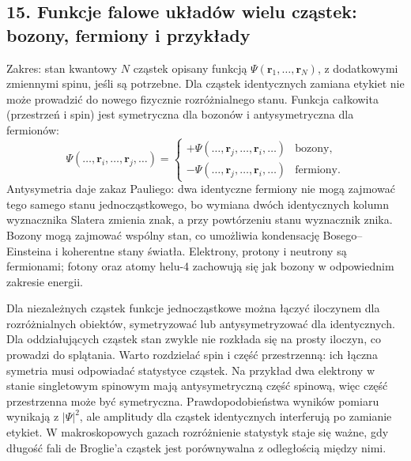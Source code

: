 \documentclass[11pt,a4paper]{article}
\begin{document}
\subsection{15. Funkcje falowe układów wielu cząstek: bozony, fermiony i przykłady}
Zakres: stan kwantowy \(N\) cząstek opisany funkcją \(\Psi(\mathbf r_1,\ldots,\mathbf r_N)\), z dodatkowymi zmiennymi spinu, jeśli są potrzebne. Dla cząstek identycznych zamiana etykiet nie może prowadzić do nowego fizycznie rozróżnialnego stanu. Funkcja całkowita (przestrzeń i spin) jest symetryczna dla bozonów i antysymetryczna dla fermionów:
\[
\Psi(\ldots,\mathbf r_i,\ldots,\mathbf r_j,\ldots)
=\begin{cases}
+\Psi(\ldots,\mathbf r_j,\ldots,\mathbf r_i,\ldots)&\text{bozony},\\
-\Psi(\ldots,\mathbf r_j,\ldots,\mathbf r_i,\ldots)&\text{fermiony}.
\end{cases}
\]
Antysymetria daje zakaz Pauliego: dwa identyczne fermiony nie mogą zajmować tego samego stanu jednocząstkowego, bo wymiana dwóch identycznych kolumn wyznacznika Slatera zmienia znak, a przy powtórzeniu stanu wyznacznik znika. Bozony mogą zajmować wspólny stan, co umożliwia kondensację Bosego--Einsteina i koherentne stany światła. Elektrony, protony i neutrony są fermionami; fotony oraz atomy helu-4 zachowują się jak bozony w odpowiednim zakresie energii.

Dla niezależnych cząstek funkcje jednocząstkowe można łączyć iloczynem dla rozróżnialnych obiektów, symetryzować lub antysymetryzować dla identycznych. Dla oddziałujących cząstek stan zwykle nie rozkłada się na prosty iloczyn, co prowadzi do splątania. Warto rozdzielać spin i część przestrzenną: ich łączna symetria musi odpowiadać statystyce cząstek. Na przykład dwa elektrony w stanie singletowym spinowym mają antysymetryczną część spinową, więc część przestrzenna może być symetryczna. Prawdopodobieństwa wyników pomiaru wynikają z \(|\Psi|^2\), ale amplitudy dla cząstek identycznych interferują po zamianie etykiet. W makroskopowych gazach rozróżnienie statystyk staje się ważne, gdy długość fali de Broglie’a cząstek jest porównywalna z odległością między nimi.
\end{document}
